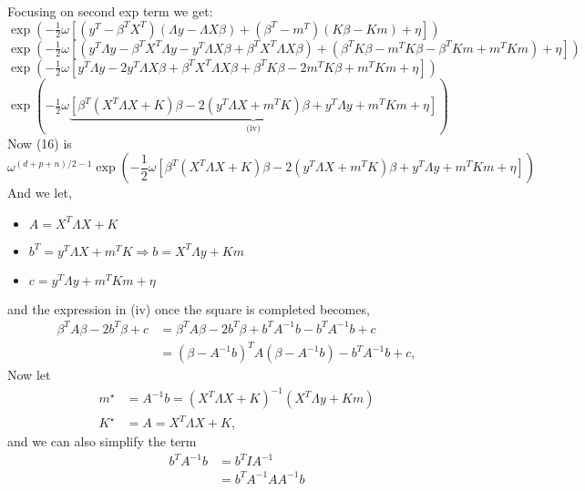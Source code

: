 \documentclass{homework}
\begin{document}
\begin{enumerate}[label=(\Alph*)]
Focusing on second exp term we get: \\
$\exp\left( -\frac{1}{2}\omega \left[ (y^T- \beta^T X^T)(\Lambda y -\Lambda X\beta) + (\beta^T -m^T)(K\beta - Km) + \eta \right] \right)$\\
$\exp\left( -\frac{1}{2}\omega \left[ (y^T\Lambda y - \beta^TX^T\Lambda y - y^T\Lambda X\beta + \beta^TX^T\Lambda X\beta) +   (\beta^TK\beta -m^TK\beta - \beta^TKm + m^TKm) + \eta \right] \right)$ \\
$\exp\left( -\frac{1}{2}\omega \left[ y^T\Lambda y - 2y^T\Lambda X\beta + \beta^TX^T\Lambda X\beta + \beta^TK\beta - 2m^TK\beta + m^TKm  + \eta \right] \right)$ \\
$\exp( -\frac{1}{2} \omega \underbrace{\left[ \beta^T(X^T\Lambda X + K)\beta - 2(y^T\Lambda X + m^T K)\beta + y^T\Lambda y + m^TKm  + \eta  \right]}_\text{(iv)})$\\		
Now (16) is
$$\omega^{(d + p + n)/2 - 1} \exp \left( -\frac{1}{2} \omega \left[ \beta^T(X^T\Lambda X + K)\beta - 2(y^T\Lambda X + m^T K)\beta + y^T\Lambda y + m^TKm  + \eta  \right]\right)$$
And we let, 
\begin{itemize}
\item $A = X^T\Lambda X + K$
\item $b^T = y^T\Lambda X + m^T K \Rightarrow b = X^T \Lambda y + Km$
\item $c = y^T\Lambda y + m^TKm + \eta$
\end{itemize}
	and the expression in (iv) once the square is completed becomes, 
	\begin{equation} \begin{split}
		\beta^T A \beta - 2b^T \beta + c &= \beta^T A \beta - 2b^T \beta +  b^TA^{-1}b - b^TA^{-1}b + c \\
		&= (\beta - A^{-1}b)^T A (\beta - A^{-1}b) - b^TA^{-1}b + c,
	\end{split}\end{equation}
	Now let 
	\begin{equation} \begin{split}
		m^\star &= A^{-1}b = (X^T\Lambda X + K)^{-1}(X^T \Lambda y + Km) \\
		K^\star &= A = X^T\Lambda X + K,
	\end{split}\end{equation}
	and we can also simplify the term
	\begin{equation} \begin{split}
		b^T A^{-1}b &= b^T I A^{-1} \\
		&= b^T A^{-1} A A^{-1} b \\

\end{split}
\end{equation}
\end{enumerate}
\end{document}
